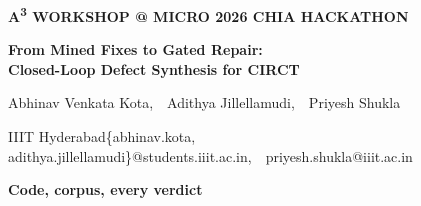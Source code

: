 \documentclass{article}
\newcommand{\body}{\fontsize{31}{41}\selectfont}
\renewcommand{\small}{\fontsize{27}{35}\selectfont}
\newenvironment{col}[1]{\begin{minipage}[t]{#1}\raggedright\body\setlength{\parskip}{0.22in}}{\end{minipage}}
\begin{document}
\body\raggedright\frenchspacing

\begin{col}{27.8in}
{\fontsize{30}{36}\selectfont\bfseries\color{mute}A\textsuperscript{3} WORKSHOP @ MICRO 2026 \hspace{0.3em}\textperiodcentered\hspace{0.3em} CHIA HACKATHON\par}
\vspace{0.1in}
{\fontsize{96}{110}\selectfont\bfseries From Mined Fixes to Gated Repair:\\Closed-Loop Defect Synthesis for CIRCT\par}
\vspace{0.1in}
{\fontsize{44}{54}\selectfont Abhinav Venkata Kota,\ \ Adithya Jillellamudi,\ \ Priyesh Shukla\par}
\vspace{-0.15in}
{\fontsize{30}{40}\selectfont\color{mute}IIIT Hyderabad\hspace{0.5em}\textperiodcentered\hspace{0.5em}\{abhinav.kota, adithya.jillellamudi\}@students.iiit.ac.in,\ \ priyesh.shukla@iiit.ac.in\par}
\end{col}\hfill
\begin{col}{5.4in}\centering
\vspace{0.05in}
\par
\vspace{-0.1in}
{\small\bfseries Code, corpus, every verdict\par}
\end{col}
\end{document}
